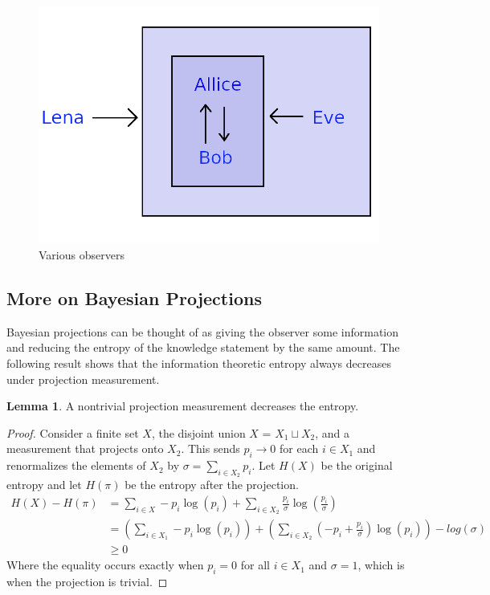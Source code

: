 \documentclass[12pt,a4paper]{article}
\theoremstyle{myrule}
\theoremstyle{postulate}
\theoremstyle{definition}
\newtheorem{lemma}[theorem]{Lemma}
\begin{document}
\begin{figure}[h]
\centering
\includegraphics[scale=1.0]{allice_and_bob.png}
\caption{Various observers}
\label{anb}
\end{figure}

\subsection{More on Bayesian Projections}
\label{entropy}
Bayesian projections can be thought of as giving the observer some information and reducing the entropy of the knowledge statement by the same amount.  The following result shows that the information theoretic entropy always decreases under projection measurement.

\begin{lemma}
A nontrivial projection measurement decreases the entropy.
\end{lemma}
\begin{proof}
Consider a finite set $X$, the disjoint union $X$ = $X_1 \sqcup X_2$, and a measurement that projects onto $X_2$.  This sends $p_i \rightarrow 0$ for each $i \in X_1$ and renormalizes the elements of $X_2$ by $\sigma = \sum_{i \in X_2} p_i$.  Let $H(X)$ be the original entropy and let $H(\pi)$ be the entropy after the projection.
\[
\begin{split}
H(X) - H(\pi) &= \sum_{i \in X} - p_i \log(p_i) + \sum_{i \in X_2} \frac{p_i}{\sigma} \log\left(\frac{p_i}{\sigma}\right) \\
              &= \left(\sum_{i \in X_1} - p_i \log(p_i)\right) + \left(\sum_{i \in X_2} \left(-p_i + \frac{p_i}{\sigma}\right) \log(p_i) \right) - log(\sigma) \\
              &\ge 0
\end{split}
\]
Where the equality occurs exactly when $p_i = 0$ for all $i \in X_1$ and $\sigma = 1$, which is when the projection is trivial. 
\end{proof}
\end{document}
